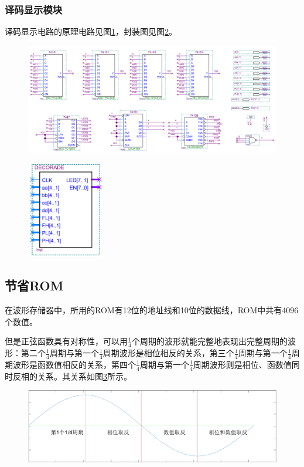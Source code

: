 \documentclass[12pt]{article}
\begin{document}
\subsubsection{译码显示模块}
译码显示电路的原理电路见图\ref{fig:yima}，封装图见图\ref{fig:fengzhuangyima}。
\begin{figure}[hp]
	\centering  
	\includegraphics[width=\textwidth]{picture/yima.png} 
	\caption{}
	\label{fig:yima}   
\end{figure}
\begin{figure}[hp]
	\centering  
	\includegraphics[width=0.3\textwidth]{picture/yimafz.png} 
	\caption{}
	\label{fig:fengzhuangyima}   
\end{figure}
\subsection{节省ROM}
在波形存储器中，所用的ROM有12位的地址线和10位的数据线，ROM中共有4096个数值。\par
但是正弦函数具有对称性，可以用$\frac{1}{4}$个周期的波形就能完整地表现出完整周期的波形：第二个$\frac{1}{4}$周期与第一个$\frac{1}{4}$周期波形是相位相反的关系，第三个$\frac{1}{4}$周期与第一个$\frac{1}{4}$周期波形是函数值相反的关系，第四个$\frac{1}{4}$周期与第一个$\frac{1}{4}$周期波形则是相位、函数值同时反相的关系。其关系如图\ref{fig:untitled}所示。
\begin{figure}[hp]
	\centering  
	\includegraphics[width=\linewidth]{picture/untitled.png} 
	\caption{}
	\label{fig:untitled}   
\end{figure}
\end{document}
